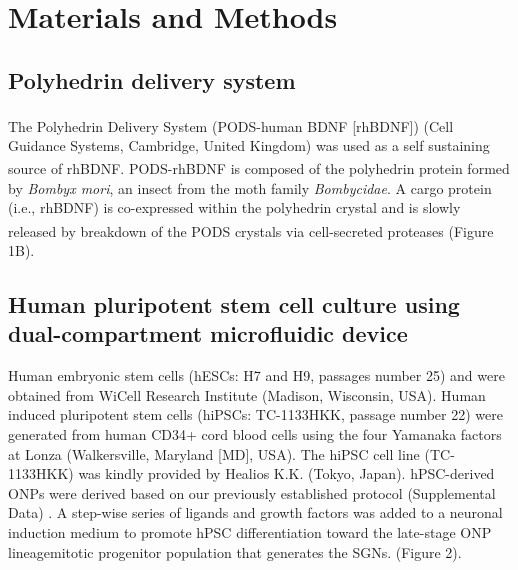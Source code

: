 \documentclass[review]{elsarticle}
\begin{document}
\section{Materials and Methods}
\subsection{Polyhedrin delivery system}
The Polyhedrin Delivery System (PODS\textsuperscript{\textregistered}-human BDNF [rhBDNF]) (Cell Guidance Systems, Cambridge, United Kingdom) was used as a self sustaining source of rhBDNF. PODS\textsuperscript{\textregistered}-rhBDNF is composed of the polyhedrin protein formed by \textit{Bombyx mori}, an insect from the moth family \textit{Bombycidae}. A cargo protein (i.e., rhBDNF) is co-expressed within the polyhedrin crystal and is slowly released by breakdown of the PODS\textsuperscript{\textregistered} crystals via cell-secreted proteases (Figure 1B)\cite{Chang2020, Suzuki1997, Guo2017}. 

\subsection{Human pluripotent stem cell culture using dual-compartment microfluidic device}
Human embryonic stem cells (hESCs: H7 and H9, passages number 25) and were obtained from WiCell Research Institute (Madison, Wisconsin, USA). Human induced pluripotent stem cells (hiPSCs:  TC-1133HKK, passage number 22) were generated from human CD34+ cord blood cells using the four Yamanaka factors at Lonza (Walkersville, Maryland [MD], USA). The hiPSC cell line (TC-1133HKK) was kindly provided by Healios K.K. (Tokyo, Japan). hPSC-derived ONPs were derived based on our previously established protocol (Supplemental Data) \cite{Heuer2021,Chang2020, Matsuoka2017g, Matsuoka2017}. A step-wise series of ligands and growth factors was added to a neuronal induction medium to promote hPSC differentiation toward the late-stage ONP lineage\textemdash mitotic progenitor population that generates the SGNs. (Figure 2).
\end{document}
